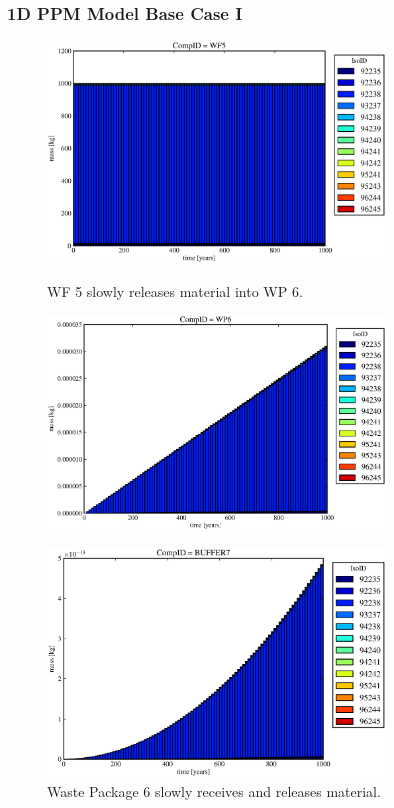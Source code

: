 

\begin{frame}
\frametitle{1D PPM Model Base Case I}
\begin{figure}[ht]
\begin{minipage}[b]{0.45\linewidth}

  \includegraphics[width=0.8\textwidth]{./images/od1.eps}
  \caption[Case ODI Waste Form Contaminants.]{
    WF 5 slowly releases material into WP 6.
    }
  \label{fig:drIVwf5}
  \includegraphics[width=0.8\textwidth]{./images/od2.eps}
  \caption[Case ODI Waste Package Contaminants.]{ 
    Waste Package 6 slowly receives and releases material. 
    }
  \label{fig:drIVbuff}
\end{minipage}
\hspace{0.05\linewidth}
\begin{minipage}[b]{0.45\linewidth}
  \includegraphics[width=0.8\textwidth]{./images/od3.eps}

\end{minipage}
\end{figure}
\end{frame}
